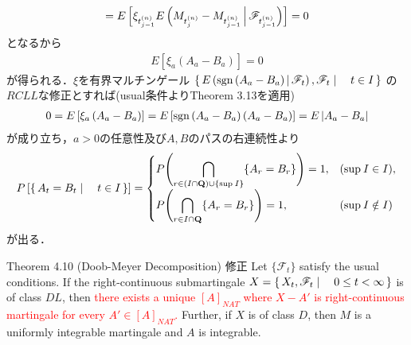 \begin{prf}
\begin{align}
			= E \left[ \xi_{t^{(n)}_{j-1}}E\left( M_{t^{(n)}_j} - M_{t^{(n)}_{j-1}} \, \middle|\, \mathscr{F}_{t^{(n)}_{j-1}} \right) \right]
			= 0 
		\end{align}
		となるから
		\begin{align}
			E\left[ \xi_a\left( A_a - B_a \right) \right] = 0
		\end{align}
		が得られる．$\xi$を有界マルチンゲール
		$\left\{\, E\left( \operatorname{sgn}\left( A_a - B_a \right) \, \middle|\, \mathscr{F}_t \right),\mathscr{F}_t \mid \quad t \in I\, \right\}$
		の$RCLL$な修正とすれば(usual条件よりTheorem 3.13を適用)
		\begin{align}
			0 = E\left[ \xi_a\left( A_a - B_a \right) \right]
			= E\left[ \operatorname{sgn}\left( A_a - B_a \right)\left( A_a - B_a \right) \right]
			= E\left| A_a - B_a \right|
		\end{align}
		が成り立ち，$a > 0$の任意性及び$A,B$のパスの右連続性より
		\begin{align}
			P\left[ \left\{\, A_t = B_t \mid \quad t \in I\, \right\}\right] =
			\begin{cases}
				\displaystyle P\Biggl( \bigcap_{r \in (I \cap \mathbf{Q}) \cup \{\operatorname*{sup}_{} I\}}\{A_r = B_r\} \Biggr) = 1, 
					& (\operatorname*{sup}_{} I \in I), \\
				\displaystyle P\Biggl( \bigcap_{r \in I \cap \mathbf{Q}}\{A_r = B_r\} \Biggr) = 1, & (\operatorname*{sup}_{} I \notin I)
			\end{cases}
		\end{align}
		が出る．
		\QED
	\end{prf}
	
	\begin{itembox}[l]{Theorem 4.10 (Doob-Meyer Decomposition) 修正}
		Let $\{\mathscr{F}_t\}$ satisfy the usual conditions. If the right-continuous
		submartingale $X = \left\{\, X_t,\mathscr{F}_t \mid \quad 0 \leq t < \infty\, \right\}$ is of class $DL$, then
		\textcolor{red}{there exists a unique $[A]_{NAT}$ where $X - A'$ is right-continuous martingale
		for every $A' \in [A]_{NAT}$.}
		Further, if $X$ is of class $D$, then $M$ is a uniformly integrable martingale 
		and $A$ is integrable.	
	\end{itembox}
	
